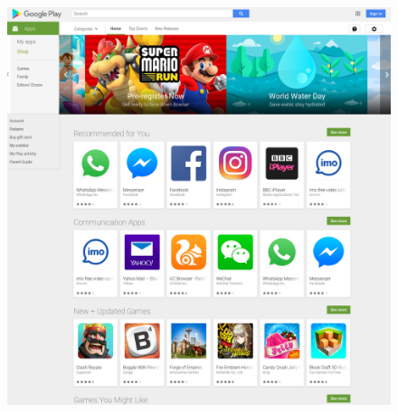 \documentclass[thesis.tex]{subfiles}
\begin{document}
\begin{figure}\centering
  \begin{minipage}{\linewidth}
    \begin{minipage}{0.48\linewidth}
      \includegraphics[width=\linewidth]{figures/google-storefront.png}
    \end{minipage}
    \begin{minipage}{0.48\linewidth}

\end{minipage}
\end{minipage}
\end{figure}
\end{document}
